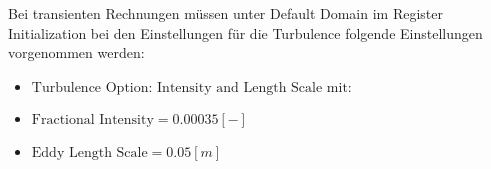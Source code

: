 Bei transienten Rechnungen müssen unter Default Domain im Register Initialization bei den Einstellungen für die Turbulence folgende Einstellungen vorgenommen werden:

\begin{itemize}
 	\item $\text{Turbulence Option: Intensity and Length Scale mit:}$
	\item $\text{Fractional Intensity} = 0.00035 [-]$
	\item $\text{Eddy Length Scale} = 0.05 [m]$
\end{itemize}








